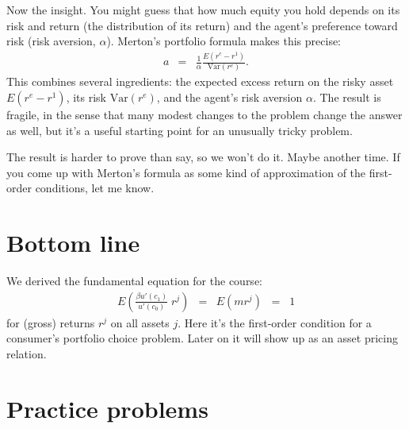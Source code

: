 Now the insight.  You might guess that how much equity you hold
depends on its risk and return (the distribution of its return)
and the agent's preference toward risk (risk aversion, $\alpha$).
Merton's portfolio formula makes this precise:
\begin{eqnarray*}
    a &=& \frac{1}{\alpha} \frac{E (r^e - r^1)}{\mbox{Var}(r^e)} .
\end{eqnarray*}
This combines several ingredients:
the expected excess return on the risky asset $E (r^e - r^1)$,
its risk $\mbox{Var}(r^e)$,
and the agent's risk aversion $\alpha$.
The result is fragile, in the sense that many modest changes to the problem
change the answer as well,
but it's a useful starting point for an unusually tricky problem.

The result is harder to prove than say, so we won't do it.
Maybe another time.
If you come up with Merton's formula as some kind of approximation
of the first-order conditions, let me know.

\begin{comment}
Merton derived it in continuous time using a set of tools
we will diligently avoid.
Here we might start with the lognormal assumption.
Let us say that $x = \log r^e - \log r^1 \sim \mathcal{N}(\kappa_1,\kappa_2)$.
Then $r^e = r^1 e^x$ and
$r^e-r^1 = r^1 (e^x-1)$.
\end{comment}


\section*{Bottom line}

We derived the fundamental equation for the course:
\begin{eqnarray*}
    E \left( \frac{\beta u'(c_1)}{u'(c_0)}\; r^j \right) &=&
        E \left( m r^j \right) \;\;=\;\;  1
\end{eqnarray*}
for (gross) returns $r^j$ on all assets $j$.
Here it's the first-order condition for a consumer's portfolio choice
problem.
Later on it will show up as an asset pricing relation.


\section*{Practice problems}

